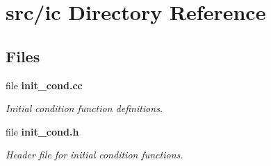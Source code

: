 \section{src/ic Directory Reference}
\label{dir_2bb7b0db68bbf14c782a582a32556304}
\subsection*{Files}
\begin{DoxyCompactItemize}
\item 
file {\bf init\-\_\-cond.\-cc}
\begin{DoxyCompactList}\small\item\em Initial condition function definitions. \end{DoxyCompactList}\item 
file {\bf init\-\_\-cond.\-h}
\begin{DoxyCompactList}\small\item\em Header file for initial condition functions. \end{DoxyCompactList}\end{DoxyCompactItemize}
